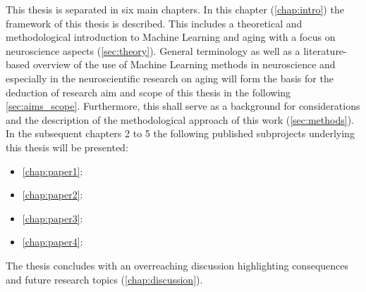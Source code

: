 This thesis is separated in six main chapters. In this chapter (\autoref{chap:intro}) the framework of this thesis is described. This includes a theoretical and methodological introduction to Machine Learning and aging with a focus on neuroscience aspects (\autoref{sec:theory}).  General terminology as well as a literature-based overview of the use of Machine Learning methods in neuroscience and especially in the neuroscientific research on aging will form the basis for the deduction of research aim and scope of this thesis in the following \autoref{sec:aims_scope}. Furthermore, this shall serve as a background for considerations and the description of the methodological approach of this work (\autoref{sec:methods}). In the subsequent chapters 2 to 5 the following published subprojects underlying this thesis will be presented:

\begin{itemize}
\item \autoref{chap:paper1}: 
\item \autoref{chap:paper2}: 
\item \autoref{chap:paper3}: 
\item \autoref{chap:paper4}: 
\end{itemize}

The thesis concludes with an overreaching discussion highlighting consequences and future research topics (\autoref{chap:discussion}).
